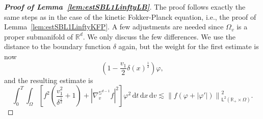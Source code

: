 \documentclass[11pt]{amsart}
\theoremstyle{definition}
\theoremstyle{remark}
\numberwithin{equation}{section}
\newcommand\R{{\mathbb R}}
\newcommand{\dd}{{\, \mathrm d}}
\newcommand{\sfL}{\mathsf{L}}
\begin{document}
\begin{proof}[{\bf Proof of Lemma~\ref{lem:estSBL1LinftyLB}}]
  The proof follows exactly the same steps as in the case of the kinetic Fokker-Planck equation, i.e., the proof of Lemma~\ref{lem:estSBL1LinftyKFP}. A few adjustments are needed since $\Omega_v$ is a proper submanifold of $\mathbb{R}^d$. We only discuss the few differences. We use the distance to the boundary function $\delta$ again, but the weight for the first estimate is now
  \begin{equation*}
    \left( 1 - \frac{v_1}{2} \delta(x)^{\frac{1}{2}} \right)  \varphi,
  \end{equation*}
  and the resulting estimate is 
  \begin{equation}
    \label{eq:Ultracontractivity1LB}
    \int_0^T \!\! \int_\Omega \left[  f^2 \left(  \frac{v_1^2}{\delta^{\frac{1}{2}}} + 1 \right) +  |\nabla_v^{\mathbb{S}^{d-1}} f|^2 \right] \varphi^2 \dd t \dd x \dd v \lesssim \left\| f (\varphi + |\varphi'|) \right\|^2 _{\sfL^2(\R_+ \times \Omega)}.
  \end{equation}


\end{proof}
\end{document}

